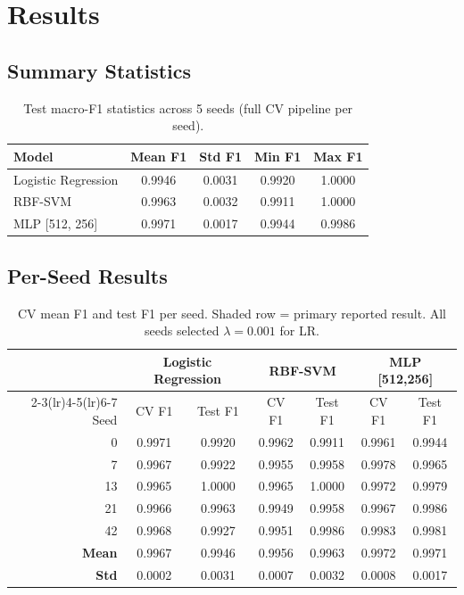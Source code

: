 \documentclass[11pt,letterpaper]{article}
\begin{document}
\section{Results}

\subsection{Summary Statistics}

\begin{table}[H]
  \centering
  \caption{Test macro-F1 statistics across 5 seeds (full CV pipeline per seed).}
  \label{tab:summary}
  \begin{tabular}{lcccc}
    \toprule
    Model & Mean F1 & Std F1 & Min F1 & Max F1 \\
    \midrule
    Logistic Regression & 0.9946 & 0.0031 & 0.9920 & 1.0000 \\
    RBF-SVM             & 0.9963 & 0.0032 & 0.9911 & 1.0000 \\
    MLP [512, 256]      & 0.9971 & 0.0017 & 0.9944 & 0.9986 \\
    \bottomrule
  \end{tabular}
\end{table}

\subsection{Per-Seed Results}

\begin{table}[H]
  \centering
  \caption{CV mean F1 and test F1 per seed.  Shaded row = primary reported result.
           All seeds selected $\lambda = 0.001$ for LR.}
  \label{tab:per_seed}
  \begin{tabular}{r cc cc cc}
    \toprule
    & \multicolumn{2}{c}{Logistic Regression}
    & \multicolumn{2}{c}{RBF-SVM}
    & \multicolumn{2}{c}{MLP [512,256]} \\
    \cmidrule(lr){2-3}\cmidrule(lr){4-5}\cmidrule(lr){6-7}
    Seed & CV F1 & Test F1 & CV F1 & Test F1 & CV F1 & Test F1 \\
    \midrule
    0   & 0.9971 & 0.9920 & 0.9962 & 0.9911 & 0.9961 & 0.9944 \\
    7   & 0.9967 & 0.9922 & 0.9955 & 0.9958 & 0.9978 & 0.9965 \\
    13  & 0.9965 & 1.0000 & 0.9965 & 1.0000 & 0.9972 & 0.9979 \\
    21  & 0.9966 & 0.9963 & 0.9949 & 0.9958 & 0.9967 & 0.9986 \\
    \rowcolor{gray!15}
    42  & 0.9968 & 0.9927 & 0.9951 & 0.9986 & 0.9983 & 0.9981 \\
    \midrule
    \textbf{Mean} & 0.9967 & 0.9946 & 0.9956 & 0.9963 & 0.9972 & 0.9971 \\
    \textbf{Std}  & 0.0002 & 0.0031 & 0.0007 & 0.0032 & 0.0008 & 0.0017 \\
    \bottomrule
  \end{tabular}
\end{table}
\end{document}
